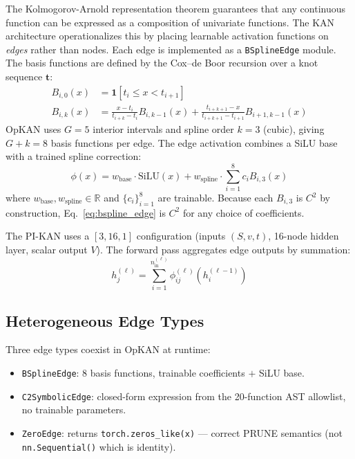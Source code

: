 \documentclass[11pt,a4paper]{article}
\begin{document}
The Kolmogorov-Arnold representation theorem \citep{kolmogorov1957representation}
guarantees that any continuous function can be expressed as a composition of
univariate functions. The KAN architecture \citep{liu_etal_2024_kan} operationalizes
this by placing learnable activation functions on \emph{edges} rather than nodes.
Each edge is implemented as a \texttt{BSplineEdge} module. The basis functions are
defined by the Cox--de Boor recursion over a knot sequence $\mathbf{t}$:
\begin{align}
B_{i,0}(x) &= \mathbf{1}[t_i \leq x < t_{i+1}] \label{eq:cox_de_boor_1} \\
B_{i,k}(x) &= \frac{x - t_i}{t_{i+k} - t_i} B_{i,k-1}(x)
             + \frac{t_{i+k+1} - x}{t_{i+k+1} - t_{i+1}} B_{i+1,k-1}(x)
\label{eq:cox_de_boor_2}
\end{align}
OpKAN uses $G=5$ interior intervals and spline order $k=3$ (cubic), giving $G+k=8$
basis functions per edge. The edge activation combines a SiLU base with a trained
spline correction:
\begin{equation}
\phi(x) = w_\text{base} \cdot \text{SiLU}(x)
         + w_\text{spline} \cdot \sum_{i=1}^{8} c_i B_{i,3}(x)
\label{eq:bspline_edge}
\end{equation}
where $w_\text{base}, w_\text{spline} \in \mathbb{R}$ and $\{c_i\}_{i=1}^8$ are
trainable. Because each $B_{i,3}$ is $C^2$ by construction, Eq.~\eqref{eq:bspline_edge}
is $C^2$ for any choice of coefficients.

The PI-KAN uses a $[3, 16, 1]$ configuration (inputs $(S,v,t)$, 16-node hidden layer,
scalar output $V$). The forward pass aggregates edge outputs by summation:
\begin{equation}
h_j^{(\ell)} = \sum_{i=1}^{n_\text{in}^{(\ell)}} \phi_{ij}^{(\ell)}\!\left(h_i^{(\ell-1)}\right)
\label{eq:kan_forward}
\end{equation}

\subsection{Heterogeneous Edge Types}
\label{sec:background:heterogeneous}

Three edge types coexist in OpKAN at runtime:
\begin{itemize}[nosep]
  \item \texttt{BSplineEdge}: 8 basis functions, trainable coefficients $+$ SiLU base.
  \item \texttt{C2SymbolicEdge}: closed-form expression from the 20-function AST
  allowlist, no trainable parameters.
  \item \texttt{ZeroEdge}: returns \texttt{torch.zeros\_like(x)} --- correct PRUNE
  semantics (not \texttt{nn.Sequential()} which is identity).
\end{itemize}
\end{document}
